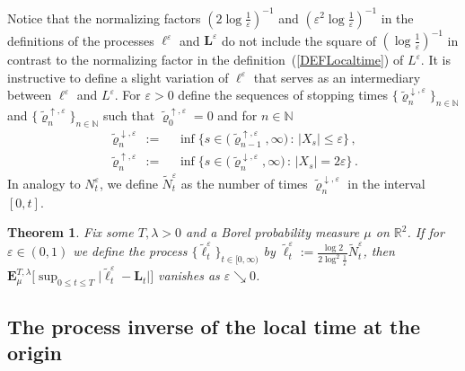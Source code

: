 \documentclass[10pt]{article}
\numberwithin{equation}{section}
\newtheorem{theorem}{Theorem}[section]
\theoremstyle{definition}
\newcommand{\R}{{\mathbb R}}
\begin{document}
Notice that the normalizing factors $ ( 2 \log \frac{1}{\varepsilon} )^{-1} $ and $ ( \varepsilon^2 \log \frac{1}{\varepsilon} )^{-1} $ in the definitions of the processes $\ell^{\varepsilon}$ and $\mathbf{L}^{\varepsilon}$ do not include the square of $(\log \frac{1}{\varepsilon} )^{-1} $ in contrast to the normalizing factor in the definition~(\ref{DEFLocaltime}) of $L^{\varepsilon}$.  It is instructive to define a slight variation of $\ell^{\varepsilon}$ that serves as an intermediary between $\ell^{\varepsilon}$ and $L^{\varepsilon}$.  For $\varepsilon>0$ define the sequences of stopping times $\{ \widetilde{\varrho}_{n}^{\downarrow,\varepsilon} \}_{n\in \mathbb{N}} $ and  $\{ \widetilde{\varrho}_{n}^{\uparrow,\varepsilon} \}_{n\in \mathbb{N}} $  such that $\widetilde{\varrho}_{0}^{\uparrow,\varepsilon}=0$ and for $n\in \mathbb{N}$
\begin{align}\label{VARRHOS2}
\widetilde{\varrho}_{n}^{\downarrow,\varepsilon}\,:=\,&\,\inf\big\{s\in \big(\widetilde{\varrho}_{n-1}^{\uparrow,\varepsilon},\infty\big) \,:\,|X_s| \leq  \varepsilon \big\}\,, \nonumber \\
\widetilde{\varrho}_{n}^{\uparrow,\varepsilon}\,:=\,&\,\inf\big\{s\in \big(\widetilde{\varrho}_{n}^{\downarrow,\varepsilon},\infty\big)\,:\,|X_s| = 2\varepsilon  \big\}\,.
\end{align}
In analogy to $N_{t}^{\varepsilon}$, we define $\widetilde{N}_{t}^{\varepsilon}$ as the number of times $\widetilde{\varrho}_{n}^{\downarrow,\varepsilon}$ in the interval $[0,t]$.
\begin{theorem}\label{THMLocalTime2} Fix some $T,\lambda>0$ and a  Borel probability measure $\mu$  on $\R^2$. If for $\varepsilon\in (0,1)$ we define the process $\{\widetilde{\ell}_t^{\varepsilon}\}_{t\in [0,\infty)}  $  by $ \widetilde{\ell}_t^{\varepsilon}:= \frac{\log 2}{2\log^2\frac{1}{\varepsilon}  }\widetilde{N}_{t}^{\varepsilon} $, then $\mathbf{E}^{T,\lambda}_{\mu}\big[\sup_{0\leq t\leq T}\big|  \widetilde{\ell}_t^{\varepsilon}  -\mathbf{L}_t  \big|    \big]$ vanishes as $\varepsilon \searrow 0$.
\end{theorem}











\subsection{The process inverse of the local time at the origin}\label{SubsectionProcInv}
\end{document}
